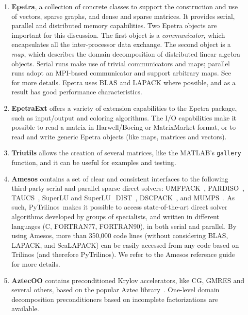\documentclass[10pt,relax]{SANDreport}
\newcommand{\PyTrilinos}{{PyTrilinos}}
\begin{document}
\begin{enumerate}

\item {\bf Epetra}, a collection of concrete classes to support the
  construction and use of vectors, sparse graphs, and dense and sparse
  matrices. It provides serial, parallel and distributed memory
  capabilities. Two Epetra objects are important for this
  discussion. The first object is a {\sl communicator}, which
  encapsulates all the inter-processor data exchange. The second
  object is a {\sl map}, which describes the domain decomposition of
  distributed linear algebra objects. Serial runs make use of trivial
  communicators and maps; parallel runs adopt an MPI-based
  communicator and support arbitrary maps. See~\cite{epetra-guide} for
  more details.  Epetra uses BLAS and LAPACK where possible, and as a
  result has good performance characteristics.

\item {\bf EpetraExt} offers a variety of extension capabilities to
  the Epetra package, such as input/output and coloring algorithms.
  The I/O capabilities make it possible to read a matrix in
  Harwell/Boeing or MatrixMarket format, or to read and write generic
  Epetra objects (like maps, matrices and vectors).

\item {\bf Triutils} allows the creation of several matrices, like the
  MATLAB's {\tt gallery} function, and it can be useful for examples
  and testing.

\item {\bf Amesos} contains a set of clear and consistent interfaces
  to the following third-party serial and parallel sparse direct
  solvers: UMFPACK~\cite{umfpack-manual},
  PARDISO~\cite{pardiso-manual}, TAUCS~\cite{taucs-manual}, SuperLU
  and SuperLU\_DIST~\cite{superlu-manual},
  DSCPACK~\cite{dscpack-manual}, and MUMPS~\cite{mumps-manual}. As
  such, \PyTrilinos\ makes it possible to access state-of-the-art
  direct solver algorithms developed by groups of specialists, and
  written in different languages (C, FORTRAN77, FORTRAN90), in both
  serial and parallel. By using Amesos, more than 350,000 code lines (without
  considering BLAS, LAPACK, and ScaLAPACK) can be easily accessed from any
  code based on Trilinos (and therefore PyTrilinos).  We refer to the Amesos
  reference guide~\cite{Amesos-Reference-Guide} for more details.

\item {\bf AztecOO} contains preconditioned Krylov accelerators, like
  CG, GMRES and several others, based on the popular Aztec
  library~\cite{aztecoo-guide}.  One-level domain decomposition
  preconditioners based on incomplete factorizations are available.


\end{enumerate}
\end{document}
